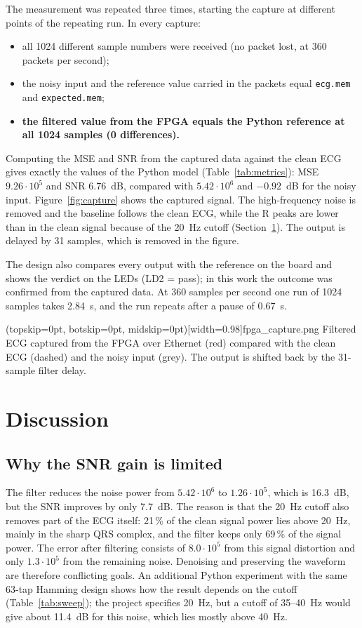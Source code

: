 \documentclass{ieeeaccess}
\begin{document}
The measurement was repeated three times, starting the capture at different points of the repeating run. In every capture:
\begin{itemize}
\item all 1024 different sample numbers were received (no packet lost, at 360 packets per second);
\item the noisy input and the reference value carried in the packets equal \texttt{ecg.mem} and \texttt{expected.mem};
\item \textbf{the filtered value from the FPGA equals the Python reference at all 1024 samples (0 differences).}
\end{itemize}
Computing the MSE and SNR from the captured data against the clean ECG gives exactly the values of the Python model (Table~\ref{tab:metrics}): MSE $9.26\cdot10^{5}$ and SNR $6.76$~dB, compared with $5.42\cdot10^{6}$ and $-0.92$~dB for the noisy input. Figure~\ref{fig:capture} shows the captured signal. The high-frequency noise is removed and the baseline follows the clean ECG, while the R peaks are lower than in the clean signal because of the 20~Hz cutoff (Section~\ref{sec:discussion}). The output is delayed by 31 samples, which is removed in the figure.

The design also compares every output with the reference on the board and shows the verdict on the LEDs (LD2 = pass); in this work the outcome was confirmed from the captured data. At 360 samples per second one run of 1024 samples takes 2.84~s, and the run repeats after a pause of 0.67~s.

\Figure[t!](topskip=0pt, botskip=0pt, midskip=0pt)[width=0.98\columnwidth]{fpga_capture.png}
{Filtered ECG captured from the FPGA over Ethernet (red) compared with the clean ECG (dashed) and the noisy input (grey). The output is shifted back by the 31-sample filter delay.\label{fig:capture}}

\section{Discussion}
\label{sec:discussion}
\subsection{Why the SNR gain is limited}
The filter reduces the noise power from $5.42\cdot10^{6}$ to $1.26\cdot10^{5}$, which is 16.3~dB, but the SNR improves by only 7.7~dB. The reason is that the 20~Hz cutoff also removes part of the ECG itself: 21\,\% of the clean signal power lies above 20~Hz, mainly in the sharp QRS complex, and the filter keeps only 69\,\% of the signal power. The error after filtering consists of $8.0\cdot10^{5}$ from this signal distortion and only $1.3\cdot10^{5}$ from the remaining noise. Denoising and preserving the waveform are therefore conflicting goals. An additional Python experiment with the same 63-tap Hamming design shows how the result depends on the cutoff (Table~\ref{tab:sweep}); the project specifies 20~Hz, but a cutoff of 35--40~Hz would give about 11.4~dB for this noise, which lies mostly above 40~Hz.
\end{document}

